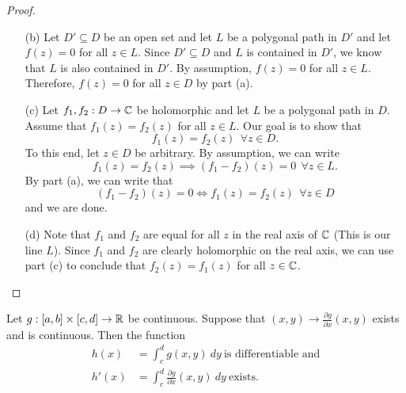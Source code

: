 \documentclass[a4paper]{article}
\begin{document}
\begin{proof}
\begin{enumerate}
    \item[(b)] Let \( D' \subseteq D  \) be an open set and let \( L  \) be a polygonal path in \( D' \) and let \( f(z) = 0  \) for all \( z \in L  \). Since \( D' \subseteq  D   \) and \( L  \) is contained in \( D' \), we know that \( L  \) is also contained in \( D' \). By assumption, \( f(z) = 0  \) for all \( z \in L  \). Therefore, \( f(z) = 0  \) for all \( z \in D  \) by part (a).
    \item[(c)] Let \( {f}_{1}, {f}_{2} : D \to \mathbb{C}  \) be holomorphic and let \( L  \) be a polygonal path in \( D  \). Assume that \( {f}_{1}(z) = {f}_{2}(z)  \) for all \( z \in L  \). Our goal is to show that   
        \[  {f}_{1}(z) = {f}_{2}(z) \ \ \forall z \in D.  \]
        To this end, let \( z \in D  \) be arbitrary. By assumption, we can write
        \[  {f}_{1}(z) = {f}_{2}(z) \implies ({f}_{1} - {f}_{2})(z) = 0 \ \ \forall z \in L.  \]
        By part (a), we can write that 
        \[  ({f}_{1} - {f}_{2})(z) = 0 \iff {f}_{1}(z) = {f}_{2}(z) \ \ \forall z \in D \]
        and we are done.
    \item[(d)] Note that \( {f}_{1}  \) and \( {f}_{2} \) are equal for all \( z  \) in the real axis of \( \mathbb{C}  \) (This is our line \( L  \)). Since \( {f}_{1} \) and \( {f}_{2} \) are clearly holomorphic on the real axis, we can use part (c) to conclude that \( {f}_{2}(z) = {f}_{1}(z) \) for all \( z \in \mathbb{C}  \).
\end{enumerate}
\end{proof}



\begin{theorem}\label{Fact}
    Let \( g: [a,b] \times [c,d] \to \mathbb{R}  \) be continuous. Suppose that \( (x,y) \to \frac{\partial g }{\partial x } (x,y) \) exists and is continuous. Then the function 
    \begin{align*}
        h(x) &= \int_{ c }^{ d }  g(x,y) \ dy \ \text{is differentiable and} \\
        h'(x) &= \int_{ c }^{ d }  \frac{\partial g }{\partial x } (x,y) \ dy \ \text{exists}.
    \end{align*}
\end{theorem}
\end{document}
